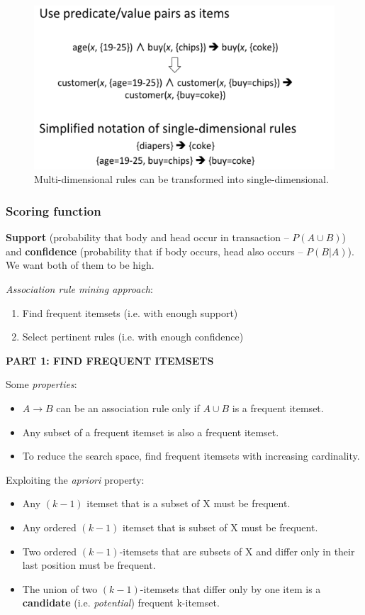     \begin{figure}[htp]
      \centering
        \includegraphics[width=.6\textwidth]{images/m2s.png}
        \caption{Multi-dimensional rules can be transformed into single-dimensional.}
        \label{fig:m2s}
    \end{figure}

  \subsubsection{Scoring function} %
  \label{ssub:scoring_function}
    \textbf{Support} (probability that body and head occur in transaction -- $P(A \cup B)$) and \textbf{confidence} (probability that if body occurs, head also occurs -- $P(B|A)$). We want both of them to be high.

    \emph{Association rule mining approach}:
    \begin{enumerate}
      \item Find frequent itemsets (i.e. with enough support)
      \item Select pertinent rules (i.e. with enough confidence)
    \end{enumerate}


    \textbf{PART 1: FIND FREQUENT ITEMSETS}

    Some \emph{properties}:
    \begin{itemize}
      \item $A\rightarrow B $ can be an association rule only if $A\cup B $ is a frequent itemset.
      \item Any subset of a frequent itemset is also a frequent itemset.
      \item To reduce the search space, find frequent itemsets with increasing cardinality.
    \end{itemize}

    Exploiting the \emph{apriori} property:
    \begin{itemize}
      \item Any $(k-1)$ itemset that is a subset of X must be frequent.
      \item Any ordered $(k-1)$ itemset that is subset of X must be frequent.
      \item Two ordered $(k-1)$-itemsets that are subsets of X and differ only in their last position must be frequent.
      \item The union of two $(k-1)$-itemsets that differ only by one item is a \textbf{candidate} (i.e. \emph{potential}) frequent k-itemset.
    \end{itemize}

